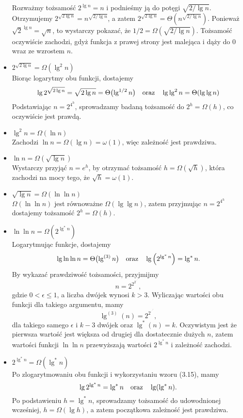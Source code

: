 \begin{itemize}
	Rozważmy tożsamość $2^{\lg n}=n$ i podnieśmy ją do potęgi $\sqrt{2/\lg n}$. Otrzymujemy $2^{\sqrt{2\lg n}}=n^{\sqrt{2/\lg n}}$, a zatem $2^{\sqrt{2\lg n}}=\Theta\left(n^{\sqrt{2/\lg n}}\right)$. Ponieważ $\sqrt{2}^{\lg n}=\sqrt{n}$, to wystarczy pokazać, że $1/2=\Omega\left(\sqrt{2/\lg n}\right)$. Tożsamość oczywiście zachodzi, gdyż funkcja z prawej strony jest malejąca i dąży do 0 wraz ze wzrostem $n$.
\item $2^{\sqrt{2\lg n}}=\Omega(\lg^2 n)$ \\
	Biorąc logarytmy obu funkcji, dostajemy
	\[
		\lg2^{\sqrt{2\lg n}} = \sqrt{2\lg n} = \Theta\bigl(\lg^{1/2}n\bigr) \quad\hbox{oraz}\quad \lg\lg^2n = \Theta(\lg\lg n)
	\]
	Podstawiając $n=2^{4^h}$, sprowadzamy badaną tożsamość do $2^h=\Omega(h)$, co oczywiście jest prawdą.
\item $\lg^2n=\Omega(\ln n)$ \\
	Zachodzi $\ln n=\Omega(\lg n)=\omega(1)$, więc zależność jest prawdziwa.
\item $\ln n=\Omega\left(\sqrt{\lg n}\right)$ \\
	Wystarczy przyjąć $n=e^h$, by otrzymać tożsamość $h=\Omega\left(\sqrt{h}\right)$, która zachodzi na mocy tego, że $\sqrt{h}=\omega(1)$.
\item $\sqrt{\lg n}=\Omega(\ln\ln n)$ \\
	$\Omega(\ln\ln n)$ jest równoważne $\Omega(\lg\lg n)$, zatem przyjmując $n=2^{4^h}$ dostajemy tożsamość $2^h=\Omega(h)$.
\item $\ln\ln n=\Omega\left(2^{\lg^*n}\right)$ \\
	Logarytmując funkcje, dostajemy
	\[
		\lg\ln\ln n = \Theta\bigl(\lg^{(3)}n\bigr) \quad\hbox{oraz}\quad \lg\left(2^{\lg^*n}\right) = \lg^*n.
	\]
	By wykazać prawdziwość tożsamości, przyjmijmy
	\[
		n = 2^{2^{2^{\cdot^{\cdot^{\cdot^\epsilon}}}}},
	\]
	gdzie $0<\epsilon\le1$, a liczba dwójek wynosi $k>3$. Wyliczając wartości obu funkcji dla takiego argumentu, mamy 
	\[
		\lg^{(3)}(n) = 2^{2^{\cdot^{\cdot^{\cdot^\epsilon}}}},
	\]
	dla takiego samego $\epsilon$ i $k-3$ dwójek oraz $\lg^*(n)=k$. Oczywistym jest że pierwsza wartość jest większa od drugiej dla dostatecznie dużych $n$, zatem wartości funkcji $\ln\ln n$ przewyższają wartości $2^{\lg^*n}$ i zależność zachodzi.
\item $2^{\lg^*n}=\Omega(\lg^*n)$ \\
	Po zlogarytmowaniu obu funkcji i wykorzystaniu wzoru (3.15), mamy
	\[
		\lg2^{\lg^*n} = \lg^*n \quad\hbox{oraz}\quad \lg(\lg^*n).
	\]
	Po podstawieniu $h=\lg^*n$, sprowadzamy tożsamość do udowodnionej wcześniej, $h=\Omega(\lg h)$, a zatem początkowa zależność jest prawdziwa.

\end{itemize}
